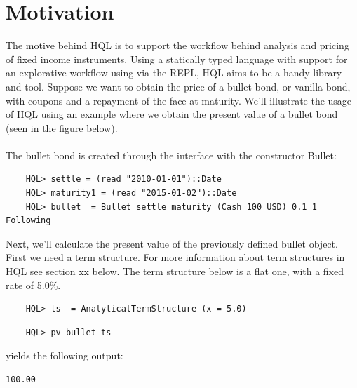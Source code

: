 \documentclass[11pt,a4paper]{article}
\numberwithin{equation}{section}
\begin{document}
        \section{Motivation}
        The motive behind HQL is to support the workflow behind analysis and pricing of fixed income instruments.
        Using a statically typed language with support for an explorative workflow using via the REPL, HQL aims to be a handy
        library and tool. Suppose we want to obtain the price of a bullet bond, or vanilla bond, with coupons and a repayment of the face at maturity.
	We'll illustrate the usage of HQL using an example where we obtain the present value of a bullet bond (seen in the figure below).
	\\\\
	The bullet bond is created through the interface with the constructor Bullet:

	\begin{lstlisting}
	HQL> settle = (read "2010-01-01")::Date
	HQL> maturity1 = (read "2015-01-02")::Date
	HQL> bullet  = Bullet settle maturity (Cash 100 USD) 0.1 1 Following
	\end{lstlisting}
	
	Next, we'll calculate the present value of the previously defined bullet object. First we need a term structure. For more information about term structures in HQL see section xx below. The term structure below is a flat one, with a fixed rate of 5.0\%.
	
	\begin{lstlisting}
	HQL> ts  = AnalyticalTermStructure (x = 5.0)	
	\end{lstlisting}

	\begin{lstlisting}	
	HQL> pv bullet ts
	\end{lstlisting}
	
	yields the following output:
	\FrameSep
	\begin{lstlisting}[style=Output]
	100.00
	\end{lstlisting}
	
	
\end{document}
